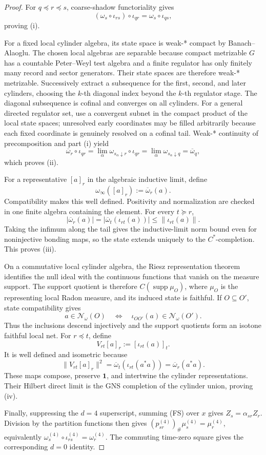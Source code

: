 \documentclass[11pt]{article}
\numberwithin{equation}{section}
\theoremstyle{remark}
\begin{document}
\begin{proof}
For \(q\preceq r\preceq s\), coarse-shadow functoriality gives
\[
(\omega_s\circ\iota_{rs})\circ\iota_{qr}
=\omega_s\circ\iota_{qs},
\]
proving \textup{(i)}.

For a fixed local cylinder algebra, its state space is weak-* compact by Banach--Alaoglu. The
chosen local algebras are separable because compact metrizable \(G\) has a countable Peter--Weyl
test algebra and a finite regulator has only finitely many record and sector generators. Their
state spaces are therefore weak-* metrizable. Successively extract a subsequence for the first,
second, and later cylinders, choosing the \(k\)-th diagonal index beyond the \(k\)-th regulator
stage. The diagonal subsequence is cofinal and converges on all cylinders. For a general
directed regulator set, use a convergent subnet in the compact product of the local state spaces;
unresolved early coordinates may be filled arbitrarily because each fixed coordinate is genuinely
resolved on a cofinal tail. Weak-* continuity of precomposition and part \textup{(i)} yield
\[
\overline\omega_r\circ\iota_{qr}
=\lim_\alpha\omega_{s_\alpha\downarrow r}\circ\iota_{qr}
=\lim_\alpha\omega_{s_\alpha\downarrow q}
=\overline\omega_q,
\]
which proves \textup{(ii)}.

For a representative \([a]_r\) in the algebraic inductive limit, define
\[
\omega_\infty([a]_r):=\overline\omega_r(a).
\]
Compatibility makes this well defined. Positivity and normalization are checked in one finite
algebra containing the element. For every \(t\succeq r\),
\[
|\overline\omega_r(a)|
=|\overline\omega_t(\iota_{rt}(a))|
\le\|\iota_{rt}(a)\|.
\]
Taking the infimum along the tail gives the inductive-limit norm bound even for noninjective
bonding maps, so the state extends uniquely to the \(C^*\)-completion. This proves
\textup{(iii)}.

On a commutative local cylinder algebra, the Riesz representation theorem identifies the null
ideal with the continuous functions that vanish on the measure support. The support quotient is
therefore \(C(\operatorname{supp}\mu_O)\), where \(\mu_O\) is the representing local Radon
measure, and its induced state is faithful. If \(O\subseteq O'\), state compatibility gives
\[
a\in\mathcal N_\omega(O)
\quad\Longleftrightarrow\quad
\iota_{OO'}(a)\in\mathcal N_\omega(O').
\]
Thus the inclusions descend injectively and the support quotients form an isotone faithful local
net. For
\(r\preceq t\), define
\[
V_{rt}[a]_r:=[\iota_{rt}(a)]_t.
\]
It is well defined and isometric because
\[
\|V_{rt}[a]_r\|^2
=\overline\omega_t(\iota_{rt}(a^*a))
=\overline\omega_r(a^*a).
\]
These maps compose, preserve \(\mathbf 1\), and intertwine the cylinder representations. Their
Hilbert direct limit is the GNS completion of the cylinder union, proving \textup{(iv)}.

Finally, suppressing the \(d=4\) superscript, summing (FS) over \(x\) gives
\(Z_s=\alpha_{sr}Z_r\). Division by the partition functions then gives
\((p_{sr}^{(4)})_\#\mu_s^{(4)}=\mu_r^{(4)}\), equivalently
\(\omega_s^{(4)}\circ\iota_{rs}^{(4)}=\omega_r^{(4)}\). The commuting time-zero square gives the
corresponding \(d=0\) identity.
\end{proof}
\end{document}
